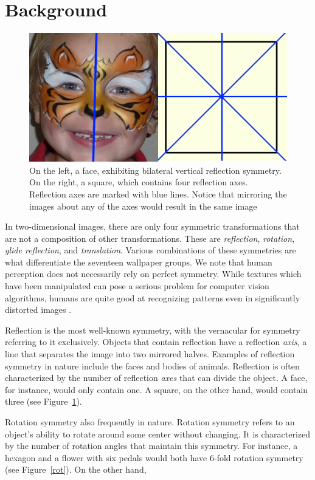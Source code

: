 \section{Background}
\begin{figure}
\centering
\includegraphics[width=0.9\columnwidth]{reflection}
\caption{On the left, a face, exhibiting bilateral vertical reflection symmetry. On the right, a square, which contains four reflection axes. Reflection axes are marked with blue lines. Notice that mirroring the images about any of the axes would result in the same image}
\label{ref}
\end{figure}

In two-dimensional images, there are only four symmetric transformations that are not a composition of other transformations. These are \textit{reflection}, \textit{rotation}, \textit{glide reflection}, and \textit{translation}. Various combinations of these symmetries are what differentiate the seventeen wallpaper groups. We note that human perception does not necessarily rely on perfect symmetry. While textures which have been manipulated can pose a serious problem for computer vision algorithms, humans are quite good at recognizing patterns even in significantly distorted images \cite{nearregular}.  

Reflection is the most well-known symmetry, with the vernacular for symmetry referring to it exclusively. Objects that contain reflection have a reflection \textit{axis}, a line that separates the image into two mirrored halves. Examples of reflection symmetry in nature include the faces and bodies of animals. Reflection is often characterized by the number of reflection \textit{axes} that can divide the object. A face, for instance, would only contain one. A square, on the other hand, would contain three (see Figure~\ref{ref}).

Rotation symmetry also frequently in nature. Rotation symmetry refers to an object's ability to rotate around some center without changing. It is characterized by the number of rotation angles that maintain this symmetry. For instance, a hexagon and a flower with six pedals would both have 6-fold rotation symmetry (see Figure~\ref{rot}). On the other hand,

